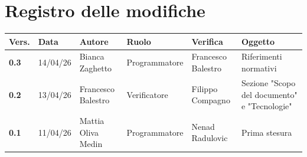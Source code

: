 \documentclass[a4paper,12pt]{article}
\begin{document}
    

    \section*{Registro delle modifiche} {
        \begin{table}[h!]
                \begin{tabularx}{\textwidth}{|l|l|l|l|L|L|}
                \hline
                \textbf{Vers.} & \textbf{Data} & \textbf{Autore} & \textbf{Ruolo} & \textbf{Verifica} & \textbf{Oggetto} \\
                \hline
                \textbf{0.3} & 14/04/26 & Bianca Zaghetto & Programmatore & Francesco Balestro & Riferimenti normativi \\
                \hline
                \textbf{0.2} & 13/04/26 & Francesco Balestro & Verificatore & Filippo Compagno & Sezione "Scopo del documento" e "Tecnologie" \\
                \hline
                \textbf{0.1} & 11/04/26 & Mattia Oliva Medin & Programmatore & Nenad Radulovic & Prima stesura \\
                \hline
            \end{tabularx}
        \end{table}
    }
    \newpage
    
    \tableofcontents
    \newpage

    \listoffigures
    \newpage
    
    \listoftables
    \newpage
\end{document}
